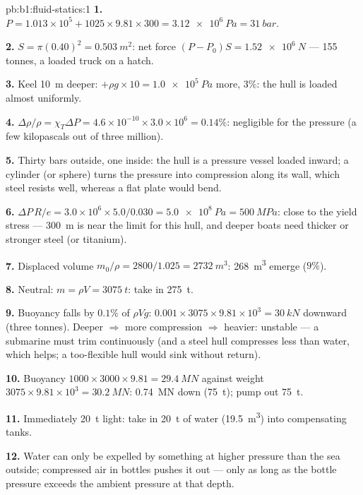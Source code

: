 \begin{solution}{pb:b1:fluid-statics:1}
\textbf{1.} $P = 1.013\times10^5 + 1025 \times 9.81 \times 300 = \qty{3.12e6}{Pa}
= \qty{31}{bar}$.

\textbf{2.} $S = \pi(0.40)^2 = \qty{0.503}{m^2}$: net force $(P - P_0)S =
\qty{1.52e6}{N}$ --- 155 tonnes, a loaded truck on a hatch.

\textbf{3.} Keel \qty{10}{m} deeper: $+\rho g \times 10 = \qty{1.0e5}{Pa}$ more,
$3\%$: the hull is loaded almost uniformly.

\textbf{4.} $\Delta\rho/\rho = \chi_T\Delta P = 4.6\times10^{-10} \times 3.0\times10^6
= 0.14\%$: negligible for the pressure (a few kilopascals out of three
million).

\textbf{5.} Thirty bars outside, one inside: the hull is a pressure
vessel loaded inward; a cylinder (or sphere) turns the pressure into
compression along its wall, which steel resists well, whereas a flat
plate would bend.

\textbf{6.} $\Delta P\,R/e = 3.0\times10^6 \times 5.0/0.030 = \qty{5.0e8}{Pa}
= \qty{500}{MPa}$: close to the yield stress --- \qty{300}{m} is near the
limit for this hull, and deeper boats need thicker or stronger steel
(or titanium).

\textbf{7.} Displaced volume $m_0/\rho = 2800/1.025 = \qty{2732}{m^3}$: \qty{268}{m^3}
emerge ($9\%$).

\textbf{8.} Neutral: $m = \rho V = \qty{3075}{t}$: take in \qty{275}{t}.

\textbf{9.} Buoyancy falls by $0.1\%$ of $\rho Vg$: $0.001 \times 3075 \times 9.81
\times10^3 = \qty{30}{kN}$ downward (three tonnes). Deeper $\Rightarrow$ more
compression $\Rightarrow$ heavier: unstable --- a submarine must trim
continuously (and a steel hull compresses less than water, which helps;
a too-flexible hull would sink without return).

\textbf{10.} Buoyancy $1000 \times 3000 \times 9.81 = \qty{29.4}{MN}$ against
weight $3075 \times 9.81 \times 10^3 = \qty{30.2}{MN}$: \qty{0.74}{MN} down
(\qty{75}{t}); pump out \qty{75}{t}.

\textbf{11.} Immediately \qty{20}{t} light: take in \qty{20}{t} of water
(\qty{19.5}{m^3}) into compensating tanks.

\textbf{12.} Water can only be expelled by something at higher pressure
than the sea outside; compressed air in bottles pushes it out --- only
as long as the bottle pressure exceeds the ambient pressure at that
depth.


\end{solution}
